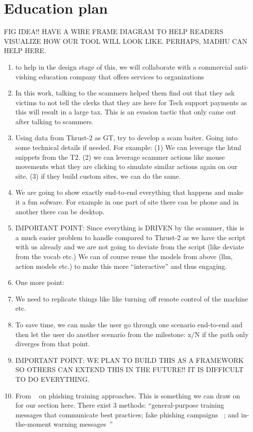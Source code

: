 \section{Education plan}
\label{sec:edu_plan}


 FIG IDEA!! HAVE A WIRE FRAME DIAGRAM TO HELP READERS VISUALIZE HOW OUR TOOL WILL LOOK LIKE. PERHAPS, MADHU CAN HELP HERE.

\begin{enumerate}

\item to help in the design stage of this, we will collaborate with a commercial anti-vishing education company that offers services to organizations
\item In this work, talking to the scammers helped them find out that they ask victims to not tell the clerks that they are here for Tech support payments as this will result in a large tax. This is an evasion tactic that only came out after talking to scammers. \cite{ayumu2024threat}   
\item Using data from Thrust-2 as GT, try to develop a scam baiter. Going into some technical details if needed. For example: (1) We can leverage the html snippets from the T2. (2) we can leverage scammer actions like mouse movements what they are clicking to simulate similar actions again on our site. (3) if they build custom sites, we can do the same. 
\item We are going to show exactly end-to-end everything that happens and make it a fun sofware. For example in one part of site there can be phone and in another there can be desktop.
\item IMPORTANT POINT: Since everything is DRIVEN by the scammer, this is a much easier problem to handle compared to Thrust-2 as we have the script with us already and we are not going to deviate from the script (like deviate from the vocab etc.) We can of course reuse the models from above (llm, action models etc.) to make this more ``interactive'' and thus engaging. 
\item One more point: 
\item We need to replicate things like like turning off remote control of the machine etc. 
\item To save time, we can make the user go through one scenario end-to-end and then let the user do another scenario from the milestone: x/N if the path only diverges from that point.
\item IMPORTANT POINT: WE PLAN TO BUILD THIS AS A FRAMEWORK SO OTHERS CAN EXTEND THIS IN THE FUTURE!! IT IS DIFFICULT TO DO EVERYTHING.
\item From ~\cite{Wash20} on phishing training approaches. This is something we can draw on for our section here. There exist 3 methods: ``general-purpose training messages that communicate best practices; fake phishing campaigns ~\cite{WashC18}; and in-the-moment warning messages~\cite{PetelkaZS19}''

\end{enumerate}





